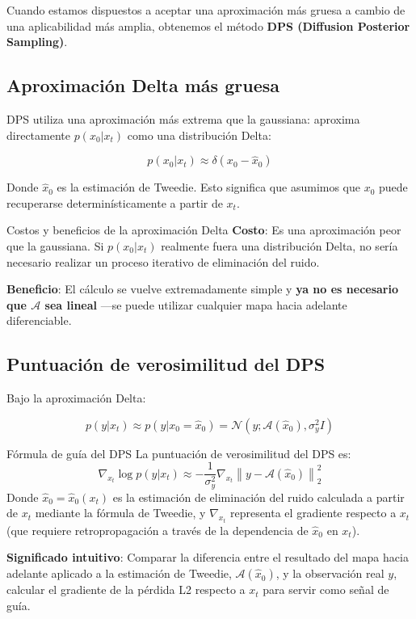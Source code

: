 \documentclass[a4paper]{article}
\begin{document}
Cuando estamos dispuestos a aceptar una aproximación más gruesa a cambio de una aplicabilidad más amplia, obtenemos el método \textbf{DPS (Diffusion Posterior Sampling)}.

\subsection{Aproximación Delta más gruesa}

DPS utiliza una aproximación más extrema que la gaussiana: aproxima directamente $p(x_0 | x_t)$ como una distribución Delta:

$$
p(x_0 | x_t) \approx \delta(x_0 - \hat{x}_0)
$$

Donde $\hat{x}_0$ es la estimación de Tweedie. Esto significa que asumimos que $x_0$ puede recuperarse determinísticamente a partir de $x_t$.

\begin{warningbox}{Costos y beneficios de la aproximación Delta}
\textbf{Costo}: Es una aproximación peor que la gaussiana. Si $p(x_0|x_t)$ realmente fuera una distribución Delta, no sería necesario realizar un proceso iterativo de eliminación del ruido.

\textbf{Beneficio}: El cálculo se vuelve extremadamente simple y \textbf{ya no es necesario que $\mathcal{A}$ sea lineal} —se puede utilizar cualquier mapa hacia adelante diferenciable.
\end{warningbox}

\subsection{Puntuación de verosimilitud del DPS}

Bajo la aproximación Delta:

$$
p(y | x_t) \approx p(y | x_0 = \hat{x}_0) = \mathcal{N}(y; \mathcal{A}(\hat{x}_0), \sigma_y^2 I)
$$

\begin{importantbox}{Fórmula de guía del DPS}
La puntuación de verosimilitud del DPS es:
$$
\nabla_{x_t} \log p(y | x_t) \approx -\frac{1}{\sigma_y^2} \nabla_{x_t} \left\| y - \mathcal{A}(\hat{x}_0) \right\|_2^2
$$
Donde $\hat{x}_0 = \hat{x}_0(x_t)$ es la estimación de eliminación del ruido calculada a partir de $x_t$ mediante la fórmula de Tweedie, y $\nabla_{x_t}$ representa el gradiente respecto a $x_t$ (que requiere retropropagación a través de la dependencia de $\hat{x}_0$ en $x_t$).

\textbf{Significado intuitivo}: Comparar la diferencia entre el resultado del mapa hacia adelante aplicado a la estimación de Tweedie, $\mathcal{A}(\hat{x}_0)$, y la observación real $y$, calcular el gradiente de la pérdida L2 respecto a $x_t$ para servir como señal de guía.
\end{importantbox}
\end{document}
